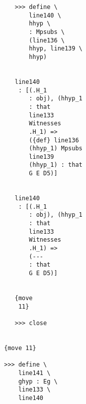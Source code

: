 \documentclass[12pt]{article}
\begin{document}
\begin{verbatim}
                                    >>> define \
                                        line140 \
                                        hhyp \
                                        : Mpsubs \
                                        (line136 \
                                        hhyp, line139 \
                                        hhyp)


                                    line140 
                                     : [(.H_1 
                                        : obj), (hhyp_1 
                                        : that 
                                        line133 
                                        Witnesses 
                                        .H_1) => 
                                        ({def} line136 
                                        (hhyp_1) Mpsubs 
                                        line139 
                                        (hhyp_1) : that 
                                        G E D5)]


                                    line140 
                                     : [(.H_1 
                                        : obj), (hhyp_1 
                                        : that 
                                        line133 
                                        Witnesses 
                                        .H_1) => 
                                        (--- 
                                        : that 
                                        G E D5)]


                                    {move 
                                     11}

                                    >>> close


                                 {move 11}

                                 >>> define \
                                     line141 \
                                     ghyp : Eg \
                                     line133 \
                                     line140



\end{verbatim}
\end{document}
